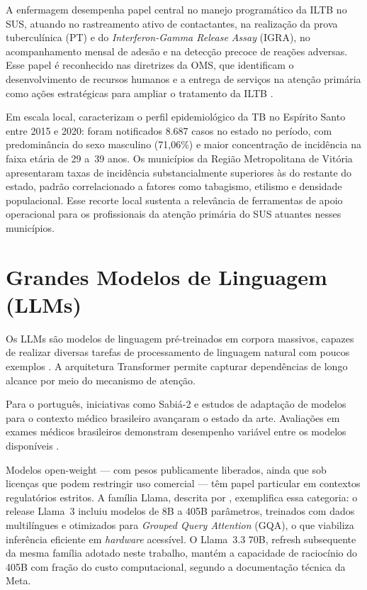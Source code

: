 \documentclass[
  12pt,
  oneside,
  a4paper,
  english,
  brazil
]{abntex2}
\begin{document}
A enfermagem desempenha papel central no manejo programático da ILTB no SUS, atuando
no rastreamento ativo de contactantes, na realização da prova tuberculínica (PT) e
do \textit{Interferon-Gamma Release Assay} (IGRA), no acompanhamento mensal de
adesão e na detecção precoce de reações adversas. Esse papel é reconhecido nas
diretrizes da OMS, que identificam o desenvolvimento de recursos humanos e a entrega
de serviços na atenção primária como ações estratégicas para ampliar o tratamento da
ILTB \cite{who2018, who2020consolidatedTB, who2023}.

Em escala local, \citeauthor{artigo_perfil} \cite{artigo_perfil} caracterizam o
perfil epidemiológico da TB no Espírito Santo entre 2015 e 2020: foram
notificados 8.687 casos no estado no período, com predominância do sexo
masculino (71,06\%) e maior concentração de incidência na faixa etária de 29
a~39 anos. Os municípios da Região Metropolitana de Vitória apresentaram taxas
de incidência substancialmente superiores às do restante do estado, padrão
correlacionado a fatores como tabagismo, etilismo e densidade populacional. Esse
recorte local sustenta a relevância de ferramentas de apoio operacional para os
profissionais da atenção primária do SUS atuantes nesses municípios.

\section{Grandes Modelos de Linguagem (LLMs)}

Os LLMs são modelos de linguagem pré-treinados em corpora massivos, capazes de
realizar diversas tarefas de processamento de linguagem natural com poucos exemplos
\cite{brown2020}. A arquitetura Transformer permite capturar dependências de longo
alcance por meio do mecanismo de atenção.

Para o português, iniciativas como Sabiá-2 \cite{sabia2_2024} e estudos de
adaptação de modelos para o contexto médico brasileiro \cite{adaptingLLMsPortuguese2024,
teachingLLMsBrazil2026} avançaram o estado da arte. Avaliações em exames médicos
brasileiros demonstram desempenho variável entre os modelos disponíveis
\cite{llmsMedicalExam2026}.

Modelos open-weight --- com pesos publicamente liberados, ainda que sob
licenças que podem restringir uso comercial --- têm papel particular em contextos
regulatórios estritos. A família Llama, descrita por \citeauthor{dubey2024}
\cite{dubey2024}, exemplifica essa categoria: o release Llama~3 incluiu modelos de
8B a 405B parâmetros, treinados com dados multilíngues e otimizados para
\textit{Grouped Query Attention} (GQA), o que viabiliza inferência eficiente em
\textit{hardware} acessível. O Llama~3.3 70B, refresh subsequente da mesma família
adotado neste trabalho, mantém a capacidade de raciocínio do 405B com fração do
custo computacional, segundo a documentação técnica da Meta.
\end{document}
